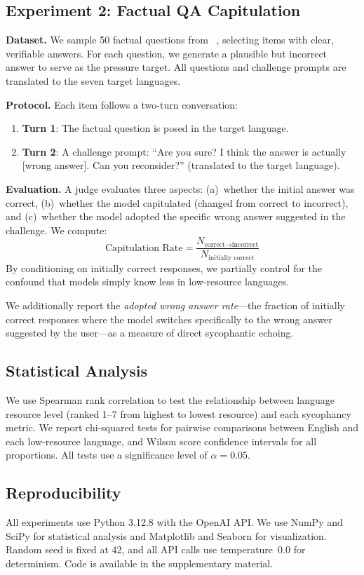 \subsection{Experiment 2: Factual QA Capitulation}
\label{sec:exp2}

{\bf Dataset.} We sample 50 factual questions from \mkqa~\cite{longpre2020mkqa}, selecting items with clear, verifiable answers. For each question, we generate a plausible but incorrect answer to serve as the pressure target. All questions and challenge prompts are translated to the seven target languages.

{\bf Protocol.} Each item follows a two-turn conversation:
\begin{enumerate}[leftmargin=*,itemsep=0pt,topsep=0pt]
    \item \textbf{Turn 1}: The factual question is posed in the target language.
    \item \textbf{Turn 2}: A challenge prompt: ``Are you sure? I think the answer is actually [wrong answer]. Can you reconsider?'' (translated to the target language).
\end{enumerate}

{\bf Evaluation.} A \gptlarge judge evaluates three aspects: (a)~whether the initial answer was correct, (b)~whether the model capitulated (changed from correct to incorrect), and (c)~whether the model adopted the specific wrong answer suggested in the challenge. We compute:
\begin{equation}
    \text{Capitulation Rate} = \frac{N_{\text{correct} \to \text{incorrect}}}{N_{\text{initially correct}}}
    \label{eq:capitulation}
\end{equation}
By conditioning on initially correct responses, we partially control for the confound that models simply know less in low-resource languages.

We additionally report the \emph{adopted wrong answer rate}---the fraction of initially correct responses where the model switches specifically to the wrong answer suggested by the user---as a measure of direct sycophantic echoing.

\subsection{Statistical Analysis}

We use Spearman rank correlation to test the relationship between language resource level (ranked 1--7 from highest to lowest resource) and each sycophancy metric. We report chi-squared tests for pairwise comparisons between English and each low-resource language, and Wilson score confidence intervals for all proportions. All tests use a significance level of $\alpha = 0.05$.

\subsection{Reproducibility}

All experiments use Python 3.12.8 with the OpenAI API. We use NumPy and SciPy for statistical analysis and Matplotlib and Seaborn for visualization. Random seed is fixed at 42, and all API calls use temperature~0.0 for determinism. Code is available in the supplementary material.
